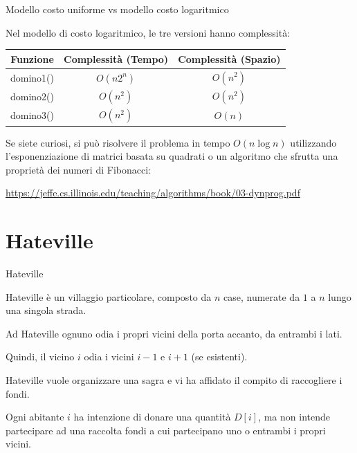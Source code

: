 \begin{frame}{Modello costo uniforme vs modello costo logaritmico}
  
Nel modello di costo logaritmico, le tre versioni hanno complessità:

\begin{center}
\begin{tabular}{|c|c|c|}
\hline
\textbf{Funzione} & \textbf{Complessità (Tempo)} & \textbf{Complessità (Spazio)} \\\hline
\textsf{domino1()} & $O(n2^n)$ & $O(n^2)$ \\\hline
\textsf{domino2()} & $O(n^2)$ & $O(n^2)$ \\\hline
\textsf{domino3()} & $O(n^2)$ & $O(n)$ \\\hline
\end{tabular}
\end{center}

\bigskip
Se siete curiosi, si può risolvere il problema in tempo $O(n \log n)$ utilizzando l'esponenziazione di matrici basata su quadrati o un algoritmo che sfrutta una proprietà dei numeri di Fibonacci:

\bigskip
\url{https://jeffe.cs.illinois.edu/teaching/algorithms/book/03-dynprog.pdf}


\end{frame}

\section{Hateville}

\begin{frame}{Hateville}

\BIL
\item Hateville è un villaggio particolare, composto da $n$ case, numerate da $1$ a 
$n$ lungo una singola strada. 

\item Ad Hateville ognuno odia i propri vicini della 
porta accanto, da entrambi i lati.
\item Quindi, il vicino $i$ odia i vicini $i-1$ e $i+1$ (se esistenti). 

\item Hateville vuole organizzare una sagra e vi 
ha affidato il compito di raccogliere i fondi. 

\item Ogni abitante $i$ ha intenzione
di  donare una quantità $D[i]$, ma non intende partecipare ad una raccolta 
fondi a cui partecipano uno o entrambi i propri vicini. 

\EIL

\end{frame}

